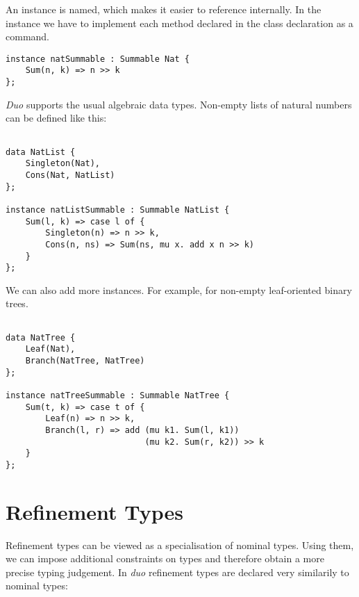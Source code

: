 An instance is named, which makes it easier to reference internally.
In the instance we have to implement each method declared in the class declaration as a command.

\begin{lstlisting}[style=duostyle, label=code:duo-nat-list, captionpos=b, caption={Instance declaration for natural numbers in \emph{duo}}]
instance natSummable : Summable Nat {
    Sum(n, k) => n >> k
};
\end{lstlisting}

\emph{Duo} supports the usual algebraic data types. Non-empty lists of natural numbers can be defined like this:

\begin{lstlisting}[style=duostyle, label=code:duo-nat-list-two, captionpos=b, caption={Data and instance declaration for non-empty lists of in \emph{duo}}]

data NatList {
    Singleton(Nat),
    Cons(Nat, NatList)
};

instance natListSummable : Summable NatList {
    Sum(l, k) => case l of {
        Singleton(n) => n >> k,
        Cons(n, ns) => Sum(ns, mu x. add x n >> k)
    }
};

\end{lstlisting}

We can also add more instances. For example, for non-empty leaf-oriented binary trees.

\begin{lstlisting}[style=duostyle, label=code:duo-tree-instance, captionpos=b, caption={Type class example  in \emph{duo}}]

data NatTree {
    Leaf(Nat),
    Branch(NatTree, NatTree)
};

instance natTreeSummable : Summable NatTree {
    Sum(t, k) => case t of {
        Leaf(n) => n >> k,
        Branch(l, r) => add (mu k1. Sum(l, k1))
                            (mu k2. Sum(r, k2)) >> k
    }
};

\end{lstlisting}


\section{Refinement Types}
\label{sec:refinement-types}

Refinement types can be viewed as a specialisation of nominal types.
Using them, we can impose additional constraints on types and therefore obtain a more precise typing judgement. \cite{springer} %
In \emph{duo} refinement types are declared very similarily to nominal types:

